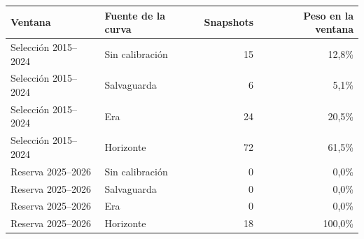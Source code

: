 \begin{tabular}{llrr}
\toprule
Ventana & Fuente de la curva & Snapshots & Peso en la ventana \\
\midrule
Selección 2015--2024 & Sin calibración & 15 & 12,8\% \\
Selección 2015--2024 & Salvaguarda & 6 & 5,1\% \\
Selección 2015--2024 & Era & 24 & 20,5\% \\
Selección 2015--2024 & Horizonte & 72 & 61,5\% \\
Reserva 2025--2026 & Sin calibración & 0 & 0,0\% \\
Reserva 2025--2026 & Salvaguarda & 0 & 0,0\% \\
Reserva 2025--2026 & Era & 0 & 0,0\% \\
Reserva 2025--2026 & Horizonte & 18 & 100,0\% \\
\bottomrule
\end{tabular}
